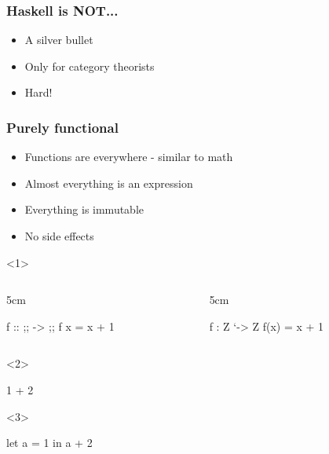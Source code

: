 \documentclass[17pt]{beamer}
\renewcommand{\(}[1]{\begin{columns}[#1]}
\renewcommand{\)}{\end{columns}}
\newcommand{\<}[1]{\begin{column}{#1}}
\renewcommand{\>}{\end{column}}
\begin{document}
\begin{frame}
  \frametitle{Haskell is NOT...}
  \begin{center}
    \begin{itemize}
    \item A silver bullet
    \item Only for category theorists
    \item<2-> Hard! 
    \end{itemize}
  \end{center}
\end{frame}

\begin{frame}[fragile]
  \frametitle{Purely functional}
  \begin{minipage}[t][.3\textheight]{\textwidth}
  \begin{itemize}
  \item<1-> Functions are everywhere - similar to math
  \item<2-> Almost everything is an expression
  \item<7-> Everything is immutable
  \item<8-> No side effects
  \end{itemize}
  \end{minipage}
  \begin{minipage}[c][.5\textheight]{\textwidth}
  \begin{center}
    \begin{onlyenv}<1>
      \({c}
      \<{5cm}
      \begin{code}[gobble=8]
        f :: ;; -> ;;
        f x = x + 1
      \end{code}
      \>
      \<{5cm}
      \begin{code}[gobble=8]
        f : Z `-> Z
        f(x) = x + 1
      \end{code}
      \>
      \)
    \end{onlyenv}
    \begin{onlyenv}<2>
      \begin{code}[gobble=8]
        1 + 2
      \end{code}
    \end{onlyenv}
    \begin{onlyenv}<3>
      \begin{code}[gobble=8]
        let a = 1
        in  a + 2
      \end{code}
    \end{onlyenv}

\end{center}
\end{minipage}
\end{frame}
\end{document}
